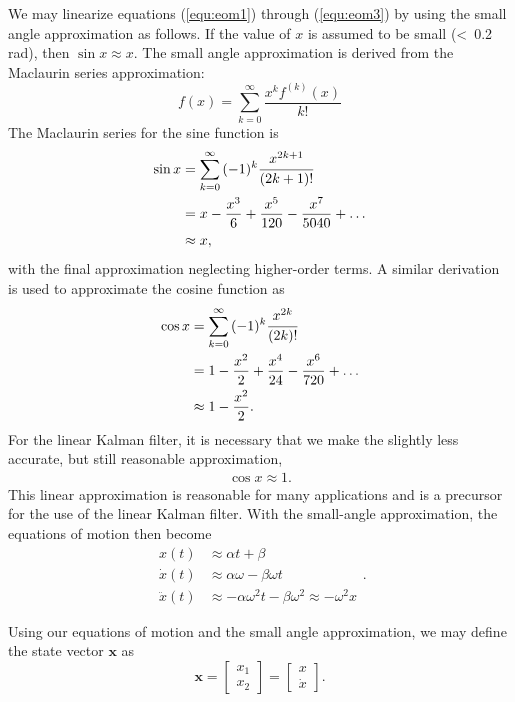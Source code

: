 \documentclass[]{article}
\begin{document}
We may linearize equations (\ref{equ:eom1}) through (\ref{equ:eom3}) by using the small angle approximation as follows. If the value of $x$ is assumed to be small (\textless \ 0.2 rad), then $\sin{x} \approx x$. The small angle approximation is derived from the Maclaurin series approximation:
\[ f(x) = \sum_{k=0}^{\infty}{\frac{x^{k}f^{(k)}(x)}{k!}} \]
The Maclaurin series for the sine function is
\[\begin{split}
\sin{x} & = \sum_{k=0}^{\infty}{(-1)^{k} \cfrac{x^{2k + 1}}{(2k + 1)!}} \\
        & = x - \frac{x^{3}}{6} + \frac{x^{5}}{120} - \frac{x^{7}}{5040} + \dots \\
        & \approx x,
\end{split}\]
with the final approximation neglecting higher-order terms. A similar derivation is used to approximate the cosine function as
\[\begin{split}
\cos{x} & = \sum_{k=0}^{\infty}{(-1)^{k} \cfrac{x^{2k}}{(2k)!}} \\
        & = 1 - \frac{x^{2}}{2} + \frac{x^{4}}{24} - \frac{x^{6}}{720} + \dots \\
        & \approx 1 - \frac{x^{2}}{2}.
\end{split}\]
For the linear Kalman filter, it is necessary that we make the slightly less accurate, but still reasonable approximation,
\[\begin{split}
\cos{x} \approx 1.
\end{split}\]
This linear approximation is reasonable for many applications and is a precursor for the use of the linear Kalman filter. With the small-angle approximation, the equations of motion then become
\begin{equation}
\begin{split}
x(t) & \approx \alpha t + \beta \\
\dot{x}(t) & \approx \alpha\omega - \beta\omega t \\
\ddot{x}(t) & \approx -\alpha\omega^{2} t - \beta\omega^{2} \approx -\omega^{2}x
\end{split}.
\label{equ:eom_linear}
\end{equation}

Using our equations of motion and the small angle approximation, we may define the state vector $\boldsymbol{x}$ as
\begin{equation}
\boldsymbol{x} = \begin{bmatrix} x_{1} \\ x_{2} \end{bmatrix}
                    = \begin{bmatrix} x \\ \dot{x} \end{bmatrix}.
\label{equ:state_variables}
\end{equation}
\end{document}
